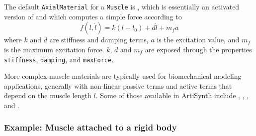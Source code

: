 The default {\tt AxialMaterial} for a {\tt Muscle} is
,
which is essentially an activated version of 
and 
which computes a simple force according to
%
\begin{equation}
f(l, \dot l) = k (l-l_0) + d \dot l + m_f a
\end{equation}
%
where $k$ and $d$ are stiffness and damping terms, $a$ is the
excitation value, and $m_f$ is the maximum excitation force.
$k$, $d$ and $m_f$ are exposed through the properties {\tt
stiffness}, {\tt damping}, and {\tt maxForce}.

More complex muscle materials are typically used for biomechanical
modeling applications, generally with non-linear passive terms and
active terms that depend on the muscle length $l$.  Some of those
available in ArtiSynth include
,
,
, and
.


\subsubsection{Example: Muscle attached to a rigid body}
\label{SimpleMuscleExample:sec}

